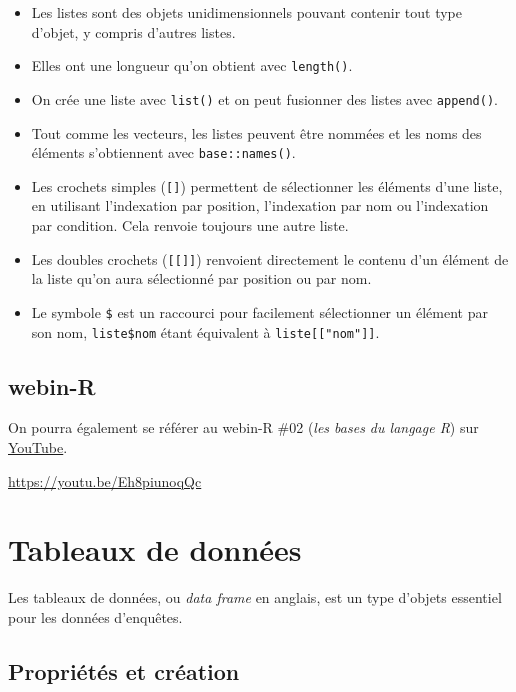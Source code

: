 \documentclass[
  letterpaper,
  DIV=11,
  numbers=noendperiod,
  oneside]{scrreprt}
\providecommand{\tightlist}{%
  \setlength{\itemsep}{0pt}\setlength{\parskip}{0pt}}\usepackage{longtable,booktabs,array}
\begin{document}
\begin{itemize}
\tightlist
\item
  Les listes sont des objets unidimensionnels pouvant contenir tout type
  d'objet, y compris d'autres listes.
\item
  Elles ont une longueur qu'on obtient avec \texttt{length()}.
\item
  On crée une liste avec \texttt{list()} et on peut fusionner des listes
  avec \texttt{append()}.
\item
  Tout comme les vecteurs, les listes peuvent être nommées et les noms
  des éléments s'obtiennent avec \texttt{base::names()}.
\item
  Les crochets simples (\texttt{{[}{]}}) permettent de sélectionner les
  éléments d'une liste, en utilisant l'indexation par position,
  l'indexation par nom ou l'indexation par condition. Cela renvoie
  toujours une autre liste.
\item
  Les doubles crochets (\texttt{{[}{[}{]}{]}}) renvoient directement le
  contenu d'un élément de la liste qu'on aura sélectionné par position
  ou par nom.
\item
  Le symbole \texttt{\$} est un raccourci pour facilement sélectionner
  un élément par son nom, \texttt{liste\$nom} étant équivalent à
  \texttt{liste{[}{[}"nom"{]}{]}}.
\end{itemize}

\hypertarget{webin-r-1}{%
\section{webin-R}\label{webin-r-1}}

On pourra également se référer au webin-R \#02 (\emph{les bases du
langage R}) sur \href{https://youtu.be/Eh8piunoqQc}{YouTube}.

\url{https://youtu.be/Eh8piunoqQc}

\hypertarget{sec-tableaux-donnees}{%
\chapter{Tableaux de données}\label{sec-tableaux-donnees}}

Les tableaux de données, ou \emph{data frame} en anglais, est un type
d'objets essentiel pour les données d'enquêtes.

\hypertarget{propriuxe9tuxe9s-et-cruxe9ation-1}{%
\section{Propriétés et
création}\label{propriuxe9tuxe9s-et-cruxe9ation-1}}
\end{document}
